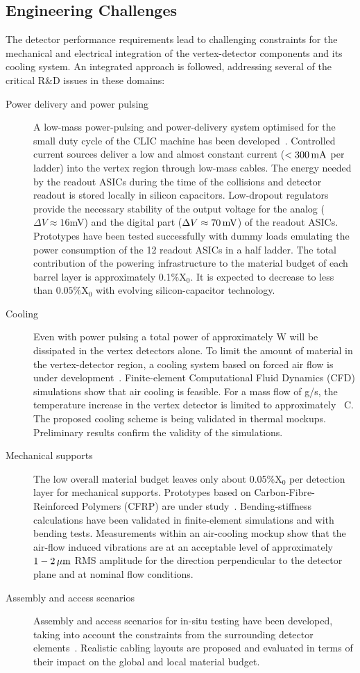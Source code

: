 \subsection{Engineering Challenges}
The detector performance requirements lead to challenging constraints
for the mechanical and electrical integration of the vertex-detector
components and its cooling system. An integrated approach is followed,
addressing several of the critical R\&D issues in these domains:
\begin{description}
\item[Power delivery and power pulsing] A low-mass power-pulsing and power-delivery
system optimised for the small duty cycle of the CLIC machine has been
developed~\cite{1748-0221-8-01-C01057}. Controlled current sources
deliver a low and almost constant current ($<\unit[300]{mA}$ per ladder)
into the vertex region through low-mass cables. The energy needed by the readout ASICs during the time of the collisions
and detector readout is stored locally in silicon capacitors. Low-dropout regulators provide the necessary stability
of the output voltage for the analog ($\Delta V\approx16$mV) and the digital part
($\Delta V\approx\unit[70]{mV}$) of the readout ASICs.
Prototypes have been tested successfully with dummy loads emulating the power consumption
of the 12 readout ASICs in a half ladder. The total contribution of the
powering infrastructure to the material budget of each barrel layer is
approximately 0.1\%X$_0$. It is expected to decrease to less than $0.05\%$X$_0$ with evolving silicon-capacitor technology.
\item[Cooling] Even with power pulsing a total power of approximately \unit[500]{W} will be dissipated in the vertex detectors alone. To limit the amount of material in the vertex-detector region, a cooling
system based on forced air flow is under development~\cite{DuarteRamos:1572989}. Finite-element Computational Fluid Dynamics (CFD) simulations show that air cooling is feasible. For a mass flow of \unit[20]{g/s}, the temperature increase
in the vertex detector is limited to approximately \unit[40]{\textdegree C}. The proposed cooling scheme is being
validated in thermal mockups. Preliminary results confirm the validity of the simulations.
\item[Mechanical supports] The low overall material budget leaves only about 0.05\%X$_0$ per
detection layer for mechanical supports. Prototypes based on Carbon-Fibre-Reinforced Polymers
(CFRP) are under study~\cite{VillarejoBermudez:1982810}. Bending-stiffness calculations have been validated in
finite-element simulations
and with bending tests. Measurements within an air-cooling mockup show
that the air-flow induced vibrations are at an acceptable level of approximately $\unit[1-2]{\micron}$ RMS
amplitude for the direction perpendicular to the detector plane and at nominal flow conditions.
\item[Assembly and access scenarios]
Assembly and access scenarios for in-situ testing have been developed,
taking into account the constraints from the surrounding detector elements~\cite{VillarejoBermudez:1982810}.
Realistic cabling layouts are proposed and evaluated in terms of their impact on the
global and local material budget.
\end{description}
